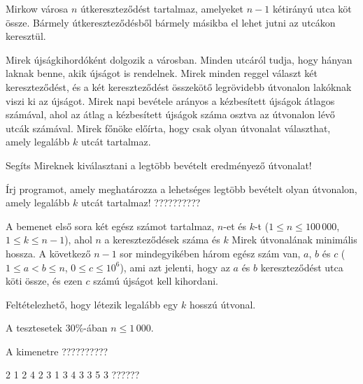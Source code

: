 





Mirkow városa $n$ útkereszteződést tartalmaz, amelyeket $n-1$ kétirányú utca köt össze. Bármely út\-ke\-resz\-te\-ző\-dés\-ből bármely másikba el lehet jutni az utcákon keresztül.

Mirek újságkihordóként dolgozik a városban. Minden utcáról tudja, hogy hányan laknak benne, akik újságot is rendelnek. Mirek minden reggel választ két kereszteződést, és a két kereszteződést összekötő legrövidebb útvonalon lakóknak viszi ki az újságot. Mirek napi bevétele arányos a kézbesített újságok átlagos számával, ahol az átlag a kézbesített újságok száma osztva az útvonalon lévő utcák számával. Mirek főnöke előírta, hogy csak olyan útvonalat választhat, amely legalább $k$ utcát tartalmaz.

Segíts Mireknek kiválasztani a legtöbb bevételt eredményező útvonalat!

Írj programot, amely meghatározza a lehetséges legtöbb bevételt olyan útvonalon, amely legalább $k$ utcát tartalmaz! ??????????

A bemenet első sora két egész számot tartalmaz, $n$-et és $k$-t ($1 \le n \le 100\,000$, $1 \le k \le n - 1$), ahol $n$ a kereszteződések száma és $k$ Mirek útvonalának minimális hossza. A következő $n-1$ sor mindegyikében három egész szám van, $a$, $b$ és $c$ ($1 \le a < b \le n$, $0 \le c \le 10^6$), ami azt jelenti, hogy az $a$ és $b$ kereszteződést utca köti össze, és ezen $c$ számú újságot kell kihordani.

Feltételezhető, hogy létezik legalább egy $k$ hosszú útvonal.

A tesztesetek $30\%$-ában $n \le 1\,000$.

A kimenetre ??????????


 2
1 2 4
2 3 1
3 4 3
3 5 3
 ??????
\sampleEND


